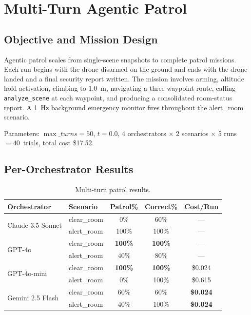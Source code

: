 \section{Multi-Turn Agentic Patrol}
\label{sec:ch4_nd2}

\subsection{Objective and Mission Design}
\label{sec:ch4_nd2_design}

Agentic patrol scales from single-scene snapshots to complete patrol missions.
Each run begins with the drone disarmed on the ground and ends with the drone landed and a final security report written.
The mission involves arming, altitude hold activation, climbing to 1.0~m, navigating a three-waypoint route, calling \texttt{analyze\_scene} at each waypoint, and
producing a consolidated room-status report.
A 1~Hz background emergency monitor fires throughout the alert\_room scenario.

Parameters: $\max\_turns = 50$, $t = 0.0$, 4 orchestrators $\times$ 2 scenarios $\times$ 5 runs $= 40$~trials, total cost \$17.52.

\subsection{Per-Orchestrator Results}
\label{sec:ch4_nd2_results}

\begin{table}[ht]
  \caption{Multi-turn patrol results.}
  \label{tab:ch4_nd2}
  \centering
  \small
  \begin{tabular}{llccc}
    \toprule
    Orchestrator & Scenario & Patrol\% & Correct\% & Cost/Run \\
    \midrule
    \multirow{2}{*}{Claude 3.5 Sonnet}
      & clear\_room & 0\%   & 60\%  & --- \\
      & alert\_room & 100\% & 100\% & --- \\
    \midrule
    \multirow{2}{*}{GPT-4o}
      & clear\_room & \textbf{100\%} & \textbf{100\%} & --- \\
      & alert\_room & 40\%  & 80\%  & --- \\
    \midrule
    \multirow{2}{*}{GPT-4o-mini}
      & clear\_room & \textbf{100\%} & \textbf{100\%} & \$0.024 \\
      & alert\_room & 0\%   & 100\% & \$0.615 \\
    \midrule
    \multirow{2}{*}{Gemini 2.5 Flash}
      & clear\_room & 60\%  & 60\%  & \textbf{\$0.024} \\
      & alert\_room & 40\%  & 100\% & \textbf{\$0.024} \\
    \bottomrule
  \end{tabular}
\end{table}

